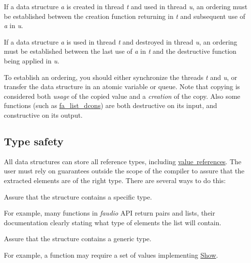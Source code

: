 \begin{DoxyItemize}
\item If a data structure {\itshape a} is created in thread {\itshape t} and used in thread {\itshape u}, an ordering must be established between the creation function returning in {\itshape t} and subsequent use of {\itshape a} in {\itshape u}.
\end{DoxyItemize}


\begin{DoxyItemize}
\item If a data structure {\itshape a} is used in thread {\itshape t} and destroyed in thread {\itshape u}, an ordering must be established between the last use of {\itshape a} in {\itshape t} and the destructive function being applied in {\itshape u}.
\end{DoxyItemize}

To establish an ordering, you should either synchronize the threads {\itshape t} and {\itshape u}, or transfer the data structure in an atomic variable or queue. Note that copying is considered both {\itshape usage} of the copied value and a {\itshape creation} of the copy. Also some functions (such as \hyperlink{group___fa_list_ga29aba2e79fd9c128c05d020be5a3b254}{fa\-\_\-list\-\_\-dcons}) are both destructive on its input, and constructive on its output.\hypertarget{md__data_structures_id19466}{}\subsection{Type safety}\label{md__data_structures_id19466}
All data structures can store all reference types, including \hyperlink{md__data_structures_ValueReferences}{value~references}. The user must rely on guarantees outside the scope of the compiler to assure that the extracted elements are of the right type. There are several ways to do this\-:


\begin{DoxyItemize}
\item Assure that the structure contains a specific type.
\begin{DoxyItemize}
\item For example, many functions in {\itshape faudio} A\-P\-I return pairs and lists, their documentation clearly stating what type of elements the list will contain.
\end{DoxyItemize}
\item Assure that the structure contains a generic type.
\begin{DoxyItemize}
\item For example, a function may require a set of values implementing \hyperlink{structfa__string__show__t}{Show}.
\end{DoxyItemize}
\end{DoxyItemize}

